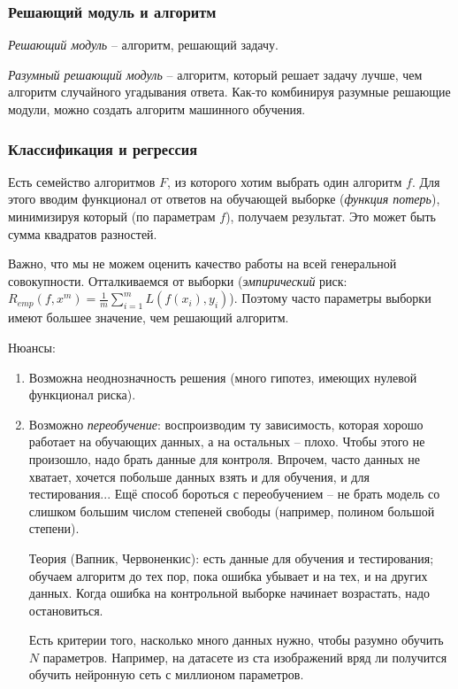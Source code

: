 \documentclass[main.tex]{subfiles}
\begin{document}
\subsubsection{Решающий модуль и алгоритм}

\emph{Решающий модуль} -- алгоритм, решающий задачу.

\emph{Разумный решающий модуль} -- алгоритм, который решает задачу лучше, чем алгоритм случайного угадывания ответа.
Как-то комбинируя разумные решающие модули, можно создать алгоритм машинного обучения.

\subsubsection{Классификация и регрессия}

Есть семейство алгоритмов $ F $, из которого хотим выбрать один алгоритм $f$.
Для этого вводим функционал от ответов на обучающей выборке (\emph{функция потерь}), минимизируя который (по параметрам $f$), получаем результат.
Это может быть сумма квадратов разностей.

Важно, что мы не можем оценить качество работы на всей генеральной совокупности.
Отталкиваемся от выборки (\emph{эмпирический} риск: $ R_{emp}(f, x^m) = \frac{1}{m} \sum_{i=1}^{m} L(f(x_i), y_i) $).
Поэтому часто параметры выборки имеют большее значение, чем решающий алгоритм.

Нюансы:

\begin{enumerate}[noitemsep]
	\item Возможна неоднозначность решения (много гипотез, имеющих нулевой функционал риска).
	\item Возможно \emph{переобучение}: воспроизводим ту зависимость, которая хорошо работает на обучающих данных, а на остальных -- плохо.
	Чтобы этого не произошло, надо брать данные для контроля.
	Впрочем, часто данных не хватает, хочется побольше данных взять и для обучения, и для тестирования...
	Ещё способ бороться с переобучением -- не брать модель со слишком большим числом степеней свободы (например, полином большой степени).
	
	Теория (Вапник, Червоненкис): есть данные для обучения и тестирования; обучаем алгоритм до тех пор, пока ошибка убывает и на тех, и на других данных.
	Когда ошибка на контрольной выборке начинает возрастать, надо остановиться.
	
	Есть критерии того, насколько много данных нужно, чтобы разумно обучить $ N $ параметров.
	Например, на датасете из ста изображений вряд ли получится обучить нейронную сеть с миллионом параметров.
\end{enumerate}
\end{document}

